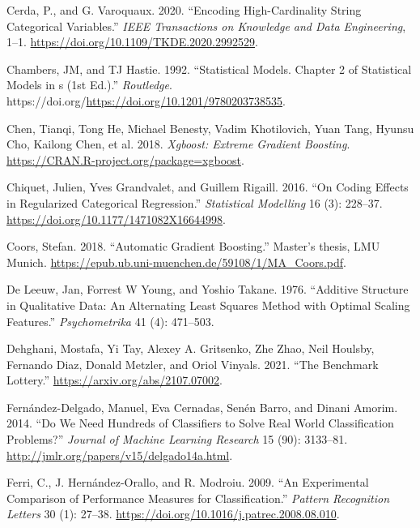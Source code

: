 \documentclass[smallextended]{svjour3}       %
\newlength{\cslhangindent}
\newlength{\cslentryspacingunit} %
\newenvironment{CSLReferences}[2] %
 {%
  \setlength{\parindent}{0pt}
  \ifodd #1
  \let\oldpar\par
  \def\par{\hangindent=\cslhangindent\oldpar}
  \fi
  \setlength{\parskip}{#2\cslentryspacingunit}
 }%
 {}
\begin{document}
\begin{CSLReferences}{1}{0}
\leavevmode{}%
Cerda, P., and G. Varoquaux. 2020. {``Encoding High-Cardinality String Categorical Variables.''} \emph{IEEE Transactions on Knowledge and Data Engineering}, 1--1. \url{https://doi.org/10.1109/TKDE.2020.2992529}.

\leavevmode{}%
Chambers, JM, and TJ Hastie. 1992. {``Statistical Models. Chapter 2 of Statistical Models in s (1st Ed.).''} \emph{Routledge}. https://doi.org/\url{https://doi.org/10.1201/9780203738535}.

\leavevmode{}%
Chen, Tianqi, Tong He, Michael Benesty, Vadim Khotilovich, Yuan Tang, Hyunsu Cho, Kailong Chen, et al. 2018. \emph{Xgboost: Extreme Gradient Boosting}. \url{https://CRAN.R-project.org/package=xgboost}.

\leavevmode{}%
Chiquet, Julien, Yves Grandvalet, and Guillem Rigaill. 2016. {``On Coding Effects in Regularized Categorical Regression.''} \emph{Statistical Modelling} 16 (3): 228--37. \url{https://doi.org/10.1177/1471082X16644998}.

\leavevmode{}%
Coors, Stefan. 2018. {``Automatic Gradient Boosting.''} Master's thesis, LMU Munich. \url{https://epub.ub.uni-muenchen.de/59108/1/MA_Coors.pdf}.

\leavevmode{}%
De Leeuw, Jan, Forrest W Young, and Yoshio Takane. 1976. {``Additive Structure in Qualitative Data: An Alternating Least Squares Method with Optimal Scaling Features.''} \emph{Psychometrika} 41 (4): 471--503.

\leavevmode{}%
Dehghani, Mostafa, Yi Tay, Alexey A. Gritsenko, Zhe Zhao, Neil Houlsby, Fernando Diaz, Donald Metzler, and Oriol Vinyals. 2021. {``The Benchmark Lottery.''} \url{https://arxiv.org/abs/2107.07002}.

\leavevmode{}%
Fernández-Delgado, Manuel, Eva Cernadas, Senén Barro, and Dinani Amorim. 2014. {``Do We Need Hundreds of Classifiers to Solve Real World Classification Problems?''} \emph{Journal of Machine Learning Research} 15 (90): 3133--81. \url{http://jmlr.org/papers/v15/delgado14a.html}.

\leavevmode{}%
Ferri, C., J. Hernández-Orallo, and R. Modroiu. 2009. {``An Experimental Comparison of Performance Measures for Classification.''} \emph{Pattern Recognition Letters} 30 (1): 27--38. \url{https://doi.org/10.1016/j.patrec.2008.08.010}.


\end{CSLReferences}
\end{document}
